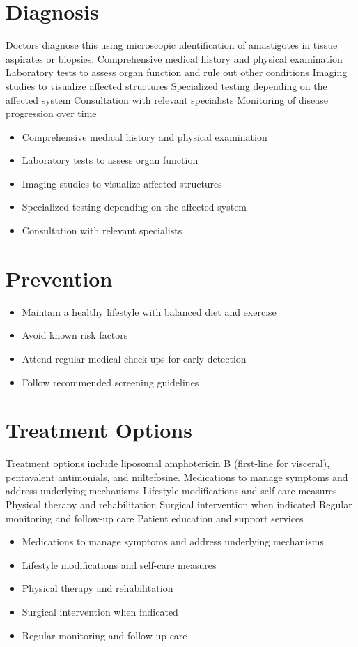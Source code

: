 \section{Diagnosis}
Doctors diagnose this using microscopic identification of amastigotes in tissue aspirates or biopsies. Comprehensive medical history and physical examination Laboratory tests to assess organ function and rule out other conditions Imaging studies to visualize affected structures Specialized testing depending on the affected system Consultation with relevant specialists Monitoring of disease progression over time

\begin{itemize}[noitemsep]
  \item Comprehensive medical history and physical examination
  \item Laboratory tests to assess organ function
  \item Imaging studies to visualize affected structures
  \item Specialized testing depending on the affected system
  \item Consultation with relevant specialists
\end{itemize}
\section{Prevention}
\begin{itemize}[noitemsep]
  \item Maintain a healthy lifestyle with balanced diet and exercise
  \item Avoid known risk factors
  \item Attend regular medical check-ups for early detection
  \item Follow recommended screening guidelines
\end{itemize}
\section{Treatment Options}
Treatment options include liposomal amphotericin B (first-line for visceral), pentavalent antimonials, and miltefosine. Medications to manage symptoms and address underlying mechanisms Lifestyle modifications and self-care measures Physical therapy and rehabilitation Surgical intervention when indicated Regular monitoring and follow-up care Patient education and support services

\begin{itemize}[noitemsep]
  \item Medications to manage symptoms and address underlying mechanisms
  \item Lifestyle modifications and self-care measures
  \item Physical therapy and rehabilitation
  \item Surgical intervention when indicated
  \item Regular monitoring and follow-up care
\end{itemize}
